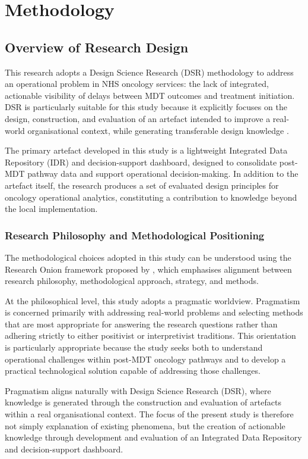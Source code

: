 \chapter{Methodology} \label{method}

\section{Overview of Research Design}

This research adopts a Design Science Research (DSR) methodology to address an operational problem in NHS oncology services: the lack of integrated, actionable visibility of delays between MDT outcomes and treatment initiation. DSR is particularly suitable for this study because it explicitly focuses on the design, construction, and evaluation of an artefact intended to improve a real-world organisational context, while generating transferable design knowledge \citep{hevner2004}.

The primary artefact developed in this study is a lightweight Integrated Data Repository (IDR) and decision-support dashboard, designed to consolidate post-MDT pathway data and support operational decision-making. In addition to the artefact itself, the research produces a set of evaluated design principles for oncology operational analytics, constituting a contribution to knowledge beyond the local implementation. 

\subsection{Research Philosophy and Methodological Positioning}

The methodological choices adopted in this study can be understood using the Research Onion framework proposed by \cite{saunders2023}, which emphasises alignment between research philosophy, methodological approach, strategy, and methods. 

At the philosophical level, this study adopts a pragmatic worldview. Pragmatism is concerned primarily with addressing real-world problems and selecting methods that are most appropriate for answering the research questions rather than adhering strictly to either positivist or interpretivist traditions. This orientation is particularly appropriate because the study seeks both to understand operational challenges within post-MDT oncology pathways and to develop a practical technological solution capable of addressing those challenges. 

Pragmatism aligns naturally with Design Science Research (DSR), where knowledge is generated through the construction and evaluation of artefacts within a real organisational context. The focus of the present study is therefore not simply explanation of existing phenomena, but the creation of actionable knowledge through development and evaluation of an Integrated Data Repository and decision-support dashboard. 

